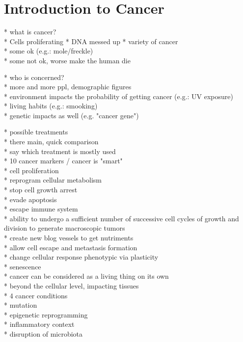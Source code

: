 \section{Introduction to Cancer}

* what is cancer?\\
  * Cells proliferating
  * DNA messed up 
  * variety of cancer\\
  * some ok (e.g.: mole/freckle)\\
  * some not ok, worse make the human die
	
* who is concerned? \\
  * more and more ppl, demographic figures\\
  * environment impacts the probability of getting cancer (e.g.: UV exposure)\\
  * living habits (e.g.: smooking)\\
  * genetic impacts as well (e.g. "cancer gene")
	
* possible treatments \\
  * there main, quick comparison\\
  * say which treatment is mostly used\\

* 10 cancer markers / cancer is "smart"\\
  * cell proliferation\\
  * reprogram cellular metabolism\\
  * stop cell growth arrest\\
  * evade apoptosis\\
  * escape immune system\\
  * ability to undergo a sufficient number of successive cell cycles of growth and division to generate macroscopic tumors\\
  * create new blog vessels to get nutriments\\
  * allow cell escape and metastasis formation\\
  * change cellular response phenotypic via plasticity\\
  * senescence\\
  
  * cancer can be considered as a living thing on its own\\
  * beyond the cellular level, impacting tissues\\

* 4 cancer conditions\\
  * mutation\\
  * epigenetic reprogramming\\
  * inflammatory context\\
  * disruption of microbiota\\


